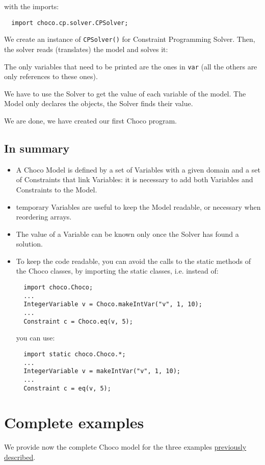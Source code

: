 with the imports:
\begin{lstlisting}
  import choco.cp.solver.CPSolver;
\end{lstlisting}
We create an instance of \texttt{CPSolver()} for Constraint Programming Solver.
Then, the solver reads (translates) the model and solves it:

The only variables that need to be printed are the ones in \texttt{var} (all the others are only references to these ones). 
\begin{note}
We have to use the Solver to get the value of each variable of the model. The Model only declares the objects, the Solver finds their value.
\end{note}
We are done, we have created our first Choco program. 


\subsection{In summary}\label{introduction:whatisimportant}\hypertarget{introduction:whatisimportant}{}
\begin{itemize}
	\item A Choco Model is defined by a set of Variables with a given domain and a set of Constraints that link Variables:
it is necessary to add both Variables and Constraints to the Model.
	\item temporary Variables are useful to keep the Model readable, or necessary when reordering arrays.
	\item The value of a Variable can be known only once the Solver has found a solution.
	\item To keep the code readable, you can avoid the calls to the static methods of the Choco classes, by importing the static classes, i.e. instead of:
\begin{lstlisting}
  import choco.Choco;
  ...
  IntegerVariable v = Choco.makeIntVar("v", 1, 10);
  ...
  Constraint c = Choco.eq(v, 5);
\end{lstlisting}
you can use:
\begin{lstlisting}
  import static choco.Choco.*;
  ...
  IntegerVariable v = makeIntVar("v", 1, 10);
  ...
  Constraint c = eq(v, 5);
\end{lstlisting}
\end{itemize}

\section{Complete examples}\label{model:completeexamples}\hypertarget{model:completeexamples}{}
We provide now the complete Choco model for the three examples \hyperlink{introduction:examples}{previously described}.

